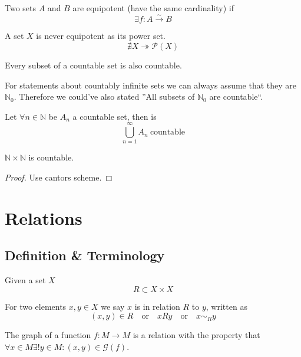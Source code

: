 \begin{definition}
   Two sets \(A\) and \(B\) are equipotent (have the same cardinality) if
   \[\exists f: A \xrightarrow{\sim} B\]
\end{definition}

\begin{theorem}[Cantor]
   A set \(X\) is never equipotent as its power set.
   \[\nexists X \twoheadrightarrow \mathcal{P}(X)\]
\end{theorem}

\begin{proposition}
   Every subset of a countable set is also countable.
\end{proposition}
\begin{remark}
   For statements about countably infinite sets we can always assume that they are \(\mathbb{N}_0\).
   Therefore we could've also stated ''All subsets of \(\mathbb{N}_0\) are countable``.
\end{remark}

\begin{proposition}
   Let \(\forall n \in \mathbb{N}\) be \(A_n\) a countable set, then is
   \[\bigcup_{n=1}^{\infty} A_n~\text{countable}\]
\end{proposition}

\begin{proposition}
   \(\mathbb{N} \times \mathbb{N}\) is countable.
\end{proposition}
\begin{proof}
   Use cantors scheme.
\end{proof}

\section{Relations}
\subsection{Definition \& Terminology}
\begin{definition}
   Given a set \(X\)
   \[R \subset X \times X\]
\end{definition}
\begin{remark}
   For two elements \(x, y \in X\) we say \(x\) is in relation \(R\) to \(y\), written as
   \[(x, y) \in R \quad\text{or}\quad xRy \quad\text{or}\quad x \sim_R y\]
\end{remark}
\begin{example}
   The graph of a function \(f: M \to M\) is a relation with the property that \(\forall x \in M \exists! y \in M: (x, y) \in \mathcal{G}(f)\).
\end{example}

